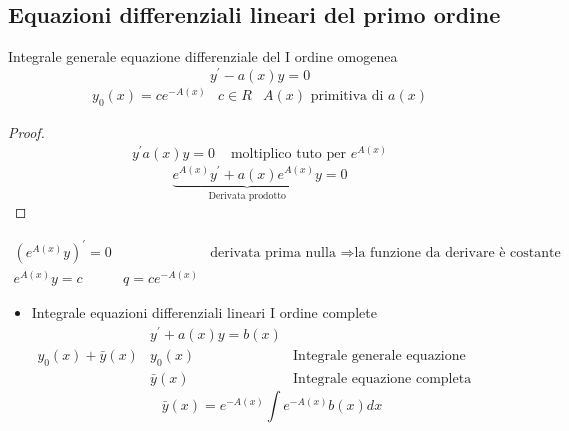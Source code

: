 \documentclass{book}
\begin{document}
\subsection{Equazioni differenziali lineari del primo ordine}
Integrale generale equazione differenziale del I ordine omogenea
\begin{equation*}
	y^\prime-a(x)y=0
\end{equation*}
\begin{eqnarray*}
	y_0(x)=ce^{-A(x)}&c\in R & A(x)\text{ primitiva di } a(x)
\end{eqnarray*}
\begin{proof}
	\begin{eqnarray*}
		y^\prime a(x)y=0 &\text{ moltiplico tuto per } e^{A(x)}
	\end{eqnarray*}
	\begin{equation*}
		\underbrace{e^{A(x)}y^\prime+a(x)e^{A(x)}y}_{\text{Derivata
		prodotto}}=0
	\end{equation*}
\end{proof}
\begin{eqnarray*}
	(e^{A(x)}y)^\prime=0 && \text{derivata prima nulla } \Rightarrow \text{la
	funzione da derivare è costante}\\
	e^{A(x)}y=c & q=ce^{-A(x)}
\end{eqnarray*}
\begin{itemize}
	\item Integrale equazioni differenziali lineari I ordine complete
		\begin{eqnarray*}
			&y^\prime+a(x)y=b(x)\\
			y_0(x)+\bar{y}(x) & y_0(x) & \text{Integrale generale equazione
			differenziale omogenea associata}\\
			&\bar{y}(x) &\text{Integrale equazione completa}
		\end{eqnarray*}
		\begin{equation*}
			\bar{y}(x)=e^{-A(x)}\int e^{-A(x)}b(x)dx
		\end{equation*}
\end{itemize}
\clearpage
\end{document}
